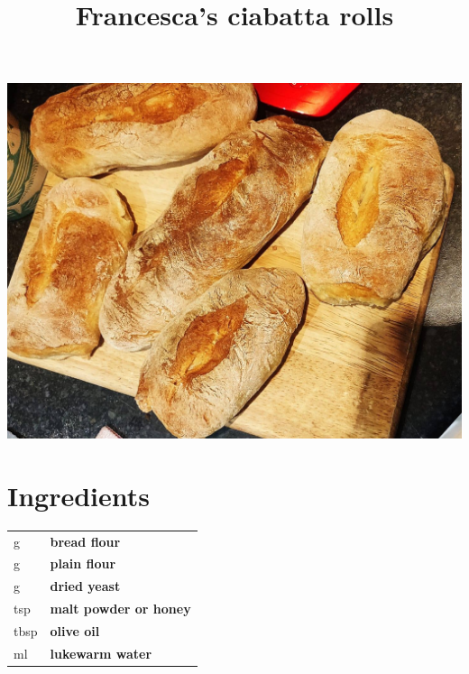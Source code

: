 \documentclass[main.tex]{subfiles}
\title{Francesca's ciabatta rolls}
\begin{document}
\maketitle%


\begin{marginfigure}%
  \includegraphics[width=\linewidth]{francesca-ciabatta.jpg}
\end{marginfigure}

\section{Ingredients}

\vspace*{-\baselineskip}
\begin{table}[ht]
	\begin{tabularx}{\textwidth}{>{\hsize=0.333\hsize}X>{\bf\hsize=1\hsize}X}
	\unit[200]{g} & bread flour\\
	\unit[200]{g} & plain flour\\
	\unit[7]{g} & dried yeast\\
	\unit[1]{tsp} & malt powder or honey\\
	\unit[2]{tbsp} & olive oil\\
	\unit[300]{ml} & lukewarm water\\
	\end{tabularx}
\end{table}
\end{document}
